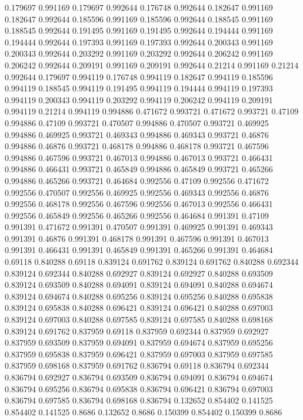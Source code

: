 0.179697 0.991169
0.179697 0.992644
0.176748 0.992644
0.182647 0.991169
0.182647 0.992644
0.185596 0.991169
0.185596 0.992644
0.188545 0.991169
0.188545 0.992644
0.191495 0.991169
0.191495 0.992644
0.194444 0.991169
0.194444 0.992644
0.197393 0.991169
0.197393 0.992644
0.200343 0.991169
0.200343 0.992644
0.203292 0.991169
0.203292 0.992644
0.206242 0.991169
0.206242 0.992644
0.209191 0.991169
0.209191 0.992644
0.21214 0.991169
0.21214 0.992644
0.179697 0.994119
0.176748 0.994119
0.182647 0.994119
0.185596 0.994119
0.188545 0.994119
0.191495 0.994119
0.194444 0.994119
0.197393 0.994119
0.200343 0.994119
0.203292 0.994119
0.206242 0.994119
0.209191 0.994119
0.21214 0.994119
0.994886 0.471672
0.993721 0.471672
0.993721 0.47109
0.994886 0.47109
0.993721 0.470507
0.994886 0.470507
0.993721 0.469925
0.994886 0.469925
0.993721 0.469343
0.994886 0.469343
0.993721 0.46876
0.994886 0.46876
0.993721 0.468178
0.994886 0.468178
0.993721 0.467596
0.994886 0.467596
0.993721 0.467013
0.994886 0.467013
0.993721 0.466431
0.994886 0.466431
0.993721 0.465849
0.994886 0.465849
0.993721 0.465266
0.994886 0.465266
0.993721 0.464684
0.992556 0.47109
0.992556 0.471672
0.992556 0.470507
0.992556 0.469925
0.992556 0.469343
0.992556 0.46876
0.992556 0.468178
0.992556 0.467596
0.992556 0.467013
0.992556 0.466431
0.992556 0.465849
0.992556 0.465266
0.992556 0.464684
0.991391 0.47109
0.991391 0.471672
0.991391 0.470507
0.991391 0.469925
0.991391 0.469343
0.991391 0.46876
0.991391 0.468178
0.991391 0.467596
0.991391 0.467013
0.991391 0.466431
0.991391 0.465849
0.991391 0.465266
0.991391 0.464684
0.69118 0.840288
0.69118 0.839124
0.691762 0.839124
0.691762 0.840288
0.692344 0.839124
0.692344 0.840288
0.692927 0.839124
0.692927 0.840288
0.693509 0.839124
0.693509 0.840288
0.694091 0.839124
0.694091 0.840288
0.694674 0.839124
0.694674 0.840288
0.695256 0.839124
0.695256 0.840288
0.695838 0.839124
0.695838 0.840288
0.696421 0.839124
0.696421 0.840288
0.697003 0.839124
0.697003 0.840288
0.697585 0.839124
0.697585 0.840288
0.698168 0.839124
0.691762 0.837959
0.69118 0.837959
0.692344 0.837959
0.692927 0.837959
0.693509 0.837959
0.694091 0.837959
0.694674 0.837959
0.695256 0.837959
0.695838 0.837959
0.696421 0.837959
0.697003 0.837959
0.697585 0.837959
0.698168 0.837959
0.691762 0.836794
0.69118 0.836794
0.692344 0.836794
0.692927 0.836794
0.693509 0.836794
0.694091 0.836794
0.694674 0.836794
0.695256 0.836794
0.695838 0.836794
0.696421 0.836794
0.697003 0.836794
0.697585 0.836794
0.698168 0.836794
0.132652 0.854402
0.141525 0.854402
0.141525 0.8686
0.132652 0.8686
0.150399 0.854402
0.150399 0.8686

